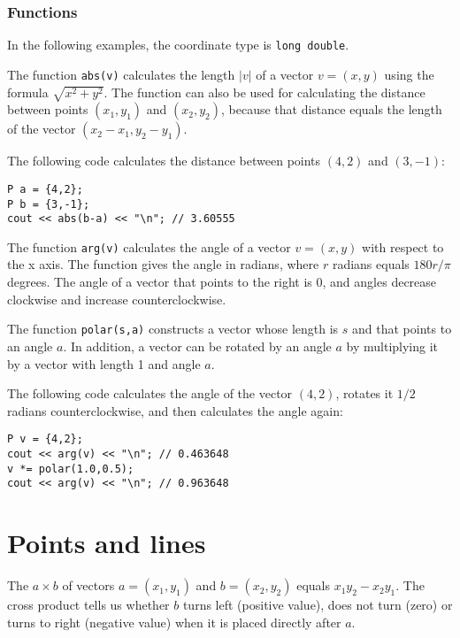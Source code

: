 \subsubsection*{Functions}

In the following examples, the coordinate type is
\texttt{long double}.

The function \texttt{abs(v)} calculates the length
$|v|$ of a vector $v=(x,y)$
using the formula $\sqrt{x^2+y^2}$.
The function can also be used for
calculating the distance between points
$(x_1,y_1)$ and $(x_2,y_2)$,
because that distance equals the length
of the vector $(x_2-x_1,y_2-y_1)$.

The following code calculates the distance
between points $(4,2)$ and $(3,-1)$:
\begin{lstlisting}
P a = {4,2};
P b = {3,-1};
cout << abs(b-a) << "\n"; // 3.60555
\end{lstlisting}

The function \texttt{arg(v)} calculates the
angle of a vector $v=(x,y)$ with respect to the x axis.
The function gives the angle in radians,
where $r$ radians equals $180 r/\pi$ degrees.
The angle of a vector that points to the right is 0,
and angles decrease clockwise and increase
counterclockwise.

The function \texttt{polar(s,a)} constructs a vector
whose length is $s$ and that points to an angle $a$.
In addition, a vector can be rotated by an angle $a$
by multiplying it by a vector with length 1 and angle $a$.

The following code calculates the angle of
the vector $(4,2)$, rotates it $1/2$ radians
counterclockwise, and then calculates the angle again:

\begin{lstlisting}
P v = {4,2};
cout << arg(v) << "\n"; // 0.463648
v *= polar(1.0,0.5);
cout << arg(v) << "\n"; // 0.963648
\end{lstlisting}

\section{Points and lines}


The  $a \times b$ of vectors
$a=(x_1,y_1)$ and $b=(x_2,y_2)$ equals $x_1 y_2 - x_2 y_1$.
The cross product tells us whether $b$
turns left (positive value), does not turn (zero)
or turns to right (negative value)
when it is placed directly after $a$.

